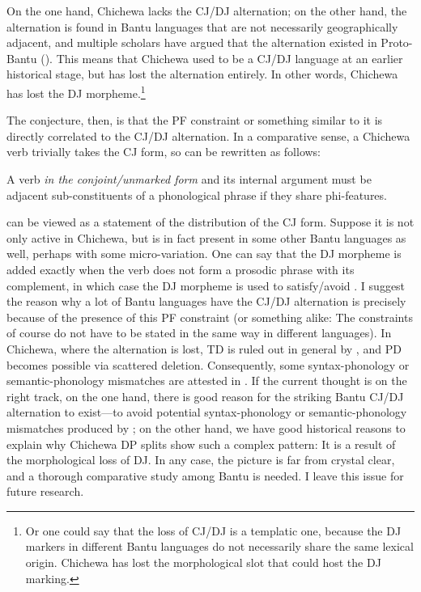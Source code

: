 \documentclass[output=paper,colorlinks,citecolor=brown
]{langscibook}
\begin{document}
 On the one hand, Chichewa lacks the CJ/DJ alternation; on the other hand, the alternation is found in Bantu languages that are not necessarily geographically adjacent, and multiple scholars have argued that the alternation existed in Proto-Bantu (\citealp{meeussen1967bantu,nurse2008tense}). This means that Chichewa used to be a CJ/DJ language at an earlier historical stage, but has lost the alternation entirely. In other words, Chichewa has lost the DJ morpheme.\footnote{Or one could say that the loss of CJ/DJ is a templatic one, because the DJ markers in different Bantu languages do not necessarily share the same lexical origin. Chichewa has lost the morphological slot that could host the DJ marking.}

The conjecture, then, is that the PF constraint  or something similar to it is directly correlated to the CJ/DJ alternation. In a comparative sense, a Chichewa verb trivially takes the CJ form, so  can be rewritten as follows:

\ea\label{ex:chen:Constraint2}
A verb \textit{in the conjoint/unmarked form} and its internal argument must be adjacent sub-constituents of a phonological phrase if they share phi-features.
\z

  can be viewed as a statement of the distribution of the CJ form. Suppose it is not only active in Chichewa, but is in fact present in some other Bantu languages as well, perhaps with some micro-variation. One can say that the DJ morpheme is added exactly when the verb does not form a prosodic phrase with its complement, in which case the DJ morpheme is used to satisfy/avoid . I suggest the reason why a lot of Bantu languages have the CJ/DJ alternation is precisely because of the presence of this PF constraint (or something alike: The constraints of course do not have to be stated in the same way in different languages). In Chichewa, where the alternation is lost, TD is ruled out in general by , and PD becomes possible via scattered deletion. Consequently, some syntax-phonology or semantic-phonology mismatches are attested in . If the current thought is on the right track, on the one hand, there is good reason for the striking Bantu CJ/DJ alternation to exist---to avoid potential syntax-phonology or semantic-phonology mismatches produced by ; on the other hand, we have good historical reasons to explain why Chichewa DP splits show such a complex pattern: It is a result of the morphological loss of DJ. In any case, the picture is far from crystal clear, and a thorough comparative study among Bantu is needed. I leave this issue for future research.
\end{document}
